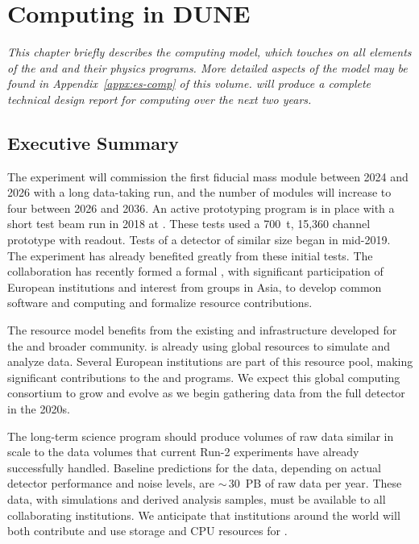 \chapter{Computing in DUNE}
\label{ch:exec-comp}

\textit{
This chapter briefly describes the  computing model, which touches on all elements of the   and  and their physics programs.  More detailed aspects of the model may be found in Appendix~\ref{appx:es-comp} of this  volume.   will produce a complete technical design report for computing over the next two years.}


\section{Executive Summary}
\label{ch:exec-comp-es}


The  experiment will commission the first \nominalmodsize fiducial mass  module between 2024 and 2026 with a long data-taking run, and the number of modules will increase to four between 2026 and 2036.  An active prototyping program is in place with  a short test beam run in 2018 at .  These tests used  a \SI{700}{t}, 15,360 channel prototype  with  readout.  Tests of a  detector of similar size began in mid-2019.   The  experiment has already  benefited greatly from these initial tests.  The collaboration has recently formed a formal , with significant participation of European institutions and interest from groups in Asia, to develop common software and computing and formalize resource contributions.

The  resource model benefits from the existing   and  infrastructure developed for the  and broader  community.   is already using global resources to simulate and analyze   data.  Several European institutions are part of this resource pool, making significant contributions to the  and  programs.  We expect this global computing consortium to grow and evolve as we begin gathering data from the full  detector in the 2020s.

The long-term  science program should produce volumes of raw data similar in scale to the data volumes that current  Run-2 experiments have already successfully handled.  Baseline predictions for the  data, depending on actual detector performance and noise levels, are $\sim\,$\SI{30}{PB} of raw data per year.  These data, with simulations and derived analysis samples, must be available to all collaborating institutions.  We anticipate that institutions around the world will both contribute and use storage and CPU resources for .

